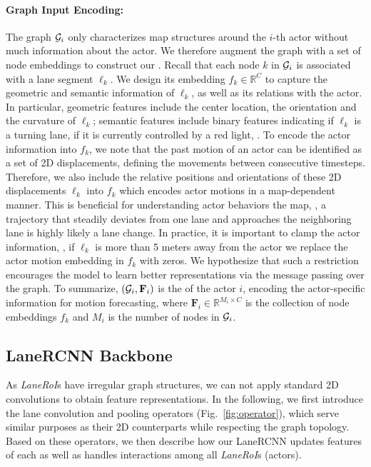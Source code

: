 \paragraph{Graph Input Encoding:}
The graph $\mathcal{G}_i$ only characterizes map structures around the $i$-th actor without much information about the actor.
We therefore augment the graph with a set of node embeddings to
construct our \ROI.
Recall that each node $k$ in $\mathcal{G}_i$ is associated with a lane
segment $\ell_k$. We design its  embedding $f_k \in \mathbb{R}^C$ 
to capture the geometric and semantic information of
$\ell_k$, as well as its relations with the actor.
In particular, geometric features include the center location, the orientation and the
curvature of $\ell_k$; semantic features include binary features indicating if
$\ell_k$ is a turning lane,  if it is currently controlled by a red light,
\etc. To encode the actor information into $f_k$, we note that the past motion of an
actor can be identified as a set of 2D displacements, defining the 
movements between consecutive timesteps. Therefore, we also include the relative
positions and orientations of these 2D displacements \wrt $\ell_k$
into $f_k$ which encodes actor motions in a map-dependent manner.
This is beneficial for understanding actor behaviors \wrt the map, \eg, a trajectory that 
steadily deviates from one lane and approaches the neighboring lane is highly likely 
a lane change.
In practice, it is important to clamp the actor information, \ie, if $\ell_k$ is more than 5 meters away from the
actor we replace the actor motion embedding in $f_k$ with zeros. 
We hypothesize that such a restriction encourages the model to learn better representations via the message passing over the graph.
To summarize, $(\mathcal{G}_i, \mathbf{F}_i)$ is the \ROI of the actor $i$, encoding
the actor-specific information for motion forecasting,
where $\mathbf{F}_i \in
\mathbb{R}^{M_i \times C}$ is the collection of node embeddings $f_k$ and 
$M_i$ is the number of nodes in $\mathcal{G}_i$. 



\subsection{LaneRCNN Backbone}
\label{sec:backbone}
As \textit{LaneRoI}s have irregular graph structures, we can not apply standard
2D convolutions to obtain feature representations. In the following, we first introduce
the lane convolution and pooling operators (Fig.~\ref{fig:operator}), which serve similar
purposes as their 2D counterparts while respecting the graph topology. 
Based on these operators, we then describe how our LaneRCNN updates features of
each \ROI as well as handles interactions among all \textit{LaneRoI}s (actors).


